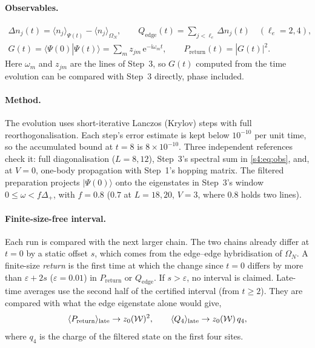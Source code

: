 \documentclass[11pt,a4paper]{article}
\newcommand{\Om}{\Omega_N}
\newcommand{\Dp}{\Delta_{+}}
\newcommand{\Prt}{P_{\mathrm{return}}}
\newcommand{\Qe}{Q_{\mathrm{edge}}}
\newcommand{\Wcal}{\mathcal{W}}
\newcommand{\eps}{\varepsilon}
\newcommand{\ii}{\mathrm{i}}
\newcommand{\ee}{\mathrm{e}}
\begin{document}
\paragraph{Observables.}
\begin{equation}
\begin{gathered}
\Delta n_j(t)=\langle n_j\rangle_{\Psi(t)}-\langle n_j\rangle_{\Om},\qquad
\Qe(t)=\sum_{j<\ell_e}\Delta n_j(t)\quad(\ell_e=2,4),\\
G(t)=\langle\Psi(0)|\Psi(t)\rangle=\sum_m z_{jm}\,\ee^{-\ii\omega_m t},\qquad
\Prt(t)=|G(t)|^2 .
\end{gathered}
\label{s4:eq:obs}
\end{equation}
Here $\omega_m$ and $z_{jm}$ are the lines of Step~3, so $G(t)$ computed from the time evolution can be compared with Step~3 directly, phase included.

\paragraph{Method.} The evolution uses short-iterative Lanczos (Krylov) steps with full reorthogonalisation. Each step's error estimate is kept below $10^{-10}$ per unit time, so the accumulated bound at $t=8$ is $8\times10^{-10}$. Three independent references check it: full diagonalisation ($L=8,12$), Step~3's spectral sum in \eqref{s4:eq:obs}, and, at $V=0$, one-body propagation with Step~1's hopping matrix. The filtered preparation projects $|\Psi(0)\rangle$ onto the eigenstates in Step~3's window $0\le\omega<f\Dp$, with $f=0.8$ ($0.7$ at $L=18,20$, $V=3$, where $0.8$ holds two lines).

\paragraph{Finite-size-free interval.} Each run is compared with the next larger chain. The two chains already differ at $t=0$ by a static offset $s$, which comes from the edge--edge hybridisation of $\Om$. A finite-size \emph{return} is the first time at which the change since $t=0$ differs by more than $\eps+2s$ ($\eps=0.01$) in $\Prt$ or $\Qe$. If $s>\eps$, no interval is claimed. Late-time averages use the second half of the certified interval (from $t\ge2$). They are compared with what the edge eigenstate alone would give,
\begin{equation}
\langle\Prt\rangle_{\rm late}\to z_0(\Wcal)^2,\qquad \langle Q_4\rangle_{\rm late}\to z_0(\Wcal)\,q_4 ,
\label{s4:eq:late}
\end{equation}
where $q_4$ is the charge of the filtered state on the first four sites.
\end{document}
